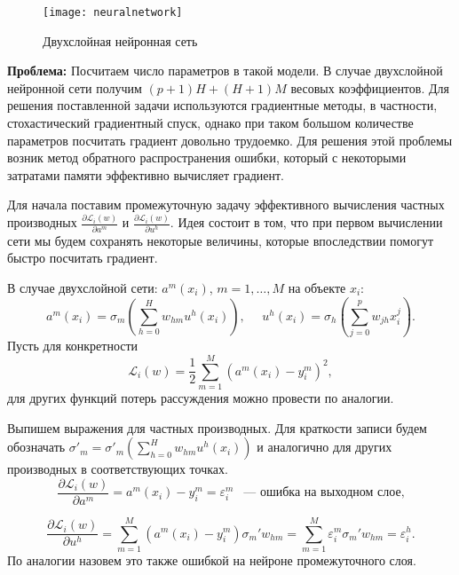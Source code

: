 \documentclass[specialist, 12pt, 
subf, %
href, colorlinks=true,
substylefile = spbu.rtx,
]{disser}
\begin{document}
\begin{figure}[h]
	\begin{center}
	\begin{minipage}{0.85\linewidth}
		\texttt{[image: neuralnetwork]}
	    \caption{Двухслойная нейронная сеть}
		\label{neuralnetwork}
	\end{minipage}
\end{center}
\end{figure}

\textbf{Проблема:} Посчитаем число параметров в такой модели. В случае двухслойной нейронной сети получим $(p+1)H+(H+1)M$ весовых коэффициентов. Для решения поставленной задачи используются градиентные методы, в частности, стохастический градиентный спуск, однако при таком большом количестве параметров посчитать градиент довольно трудоемко. Для решения этой проблемы возник метод обратного распространения ошибки, который с некоторыми затратами памяти эффективно вычисляет градиент.

Для начала поставим промежуточную задачу эффективного вычисления частных производных $\frac{\partial \mathcal{L}_i(w)}{\partial a^m}$ и $\frac{\partial \mathcal{L}_i(w)}{\partial u^h}$. Идея состоит в том, что при первом вычислении сети мы будем сохранять некоторые величины, которые впоследствии помогут быстро посчитать градиент.

В случае двухслойной сети: $a^m(x_i)$, $m=1,\ldots,M$ на объекте $x_i$:
\begin{equation*}
a^m(x_i) = \sigma_m \left(\sum_{h=0}^{H} w_{hm}  u^h(x_i)  \right), ~~~~~~
 u^h(x_i) = \sigma_h \left(\sum_{j=0}^{p} w_{jh} x_{i}^j   \right).
\end{equation*}
Пусть для конкретности
\begin{equation*}
\mathcal{L}_i(w) = \frac{1}{2} \sum_{m=1}^{M}(a^m(x_i) - y^m_i)^2,
\end{equation*}
для других функций потерь рассуждения можно провести по аналогии.

Выпишем выражения для частных производных. Для краткости записи будем обозначать $\sigma'_m = \sigma'_m (\sum\limits_{h=0}^H w_{hm} u^h(x_i))$ и аналогично для других производных в соответствующих точках.
\begin{equation*}
\frac{\partial \mathcal{L}_i(w)}{\partial a^m} = a^m(x_i) - y_i^m = \varepsilon^m_i ~~\text{ --- ошибка на выходном слое,}
\end{equation*}

\begin{equation*}
\frac{\partial \mathcal{L}_i(w)}{\partial u^h} = \sum \limits_{m=1}^M (a^m(x_i) - y_i^m) \sigma_m' w_{hm} = \sum \limits_{m=1}^M \varepsilon^m_i \sigma_m' w_{hm} = \varepsilon^h_i.
\end{equation*}
По аналогии назовем это также ошибкой на нейроне промежуточного слоя.
\end{document}
